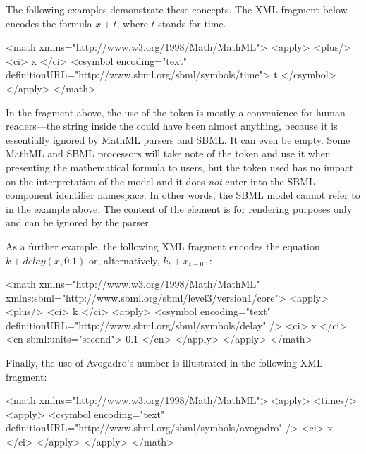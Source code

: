 The following examples demonstrate these concepts.  The XML fragment below
encodes the formula $x + t$, where $t$ stands for time.

\begin{example}
<math xmlns="http://www.w3.org/1998/Math/MathML">
    <apply>
        <plus/>
        <ci> x </ci>
        <csymbol encoding="text" definitionURL="http://www.sbml.org/sbml/symbols/time">
            t
        </csymbol>
    </apply>
</math>
\end{example}

\clearpage

In the fragment above, the use of the token  is mostly a
convenience for human readers---the string inside the
 could have been almost anything, because it is
essentially ignored by MathML parsers and SBML.  It can
  even be empty.  Some MathML and SBML processors will take note
of the token and use it when presenting the mathematical formula
to users, but the token used has no impact on the interpretation
of the model and it does \emph{not} enter into the SBML component
identifier namespace.  In other words, the SBML model cannot refer
to  in the example above.  The content of the
 element is for rendering purposes only and can be
ignored by the parser.

As a further example, the following XML fragment encodes the equation
$k + delay(x, 0.1)$ or, alternatively, $k_t + x_{t - 0.1}$:

\begin{example}
<math xmlns="http://www.w3.org/1998/Math/MathML"
      xmlns:sbml="http://www.sbml.org/sbml/level3/version1/core">
    <apply>
        <plus/>
        <ci> k </ci>
        <apply>
            <csymbol encoding="text" definitionURL="http://www.sbml.org/sbml/symbols/delay" />
            <ci> x </ci>
            <cn sbml:units="second"> 0.1 </cn>
        </apply>
    </apply>
</math>
\end{example}

Finally, the use of Avogadro's number is illustrated in the
following XML fragment:

\begin{example}
<math xmlns="http://www.w3.org/1998/Math/MathML">
    <apply>
        <times/>
        <apply>
            <csymbol encoding="text" definitionURL="http://www.sbml.org/sbml/symbols/avogadro" />
            <ci> x </ci>
        </apply>
    </apply>
</math>
\end{example}


